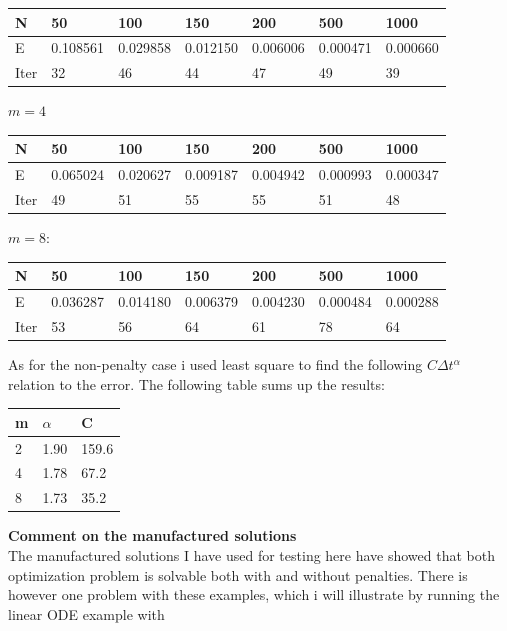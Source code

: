 \documentclass[11pt,a4paper]{report}
\begin{document}
\begin{center}
    \begin{tabular}{| l | l | l | l | l | l | l |}
    \hline
    N & 50 & 100  & 150 & 200 & 500 & 1000 \\ \hline
    E & 0.108561 & 0.029858 &0.012150 & 0.006006 & 0.000471 & 0.000660	\\ \hline
    Iter & 32 & 46  & 44 & 47 & 49 & 39 \\ \hline
    \end{tabular}
\end{center}
$m=4$
\begin{center}
    \begin{tabular}{| l | l | l | l | l | l | l |}
    \hline
    N & 50 & 100  & 150 & 200 & 500 & 1000 \\ \hline
    E & 0.065024 & 0.020627& 0.009187& 0.004942 & 0.000993 & 0.000347\\ \hline
    Iter & 49 & 51  & 55 & 55 & 51 & 48 \\ \hline
    \end{tabular}
\end{center}
$m=8$:
\begin{center}
    \begin{tabular}{| l | l | l | l | l | l | l |}
    \hline
    N & 50 & 100  & 150 & 200 & 500 & 1000 \\ \hline
    E & 0.036287 & 0.014180 &0.006379 & 0.004230 & 0.000484 & 0.000288	\\ \hline
    Iter & 53 & 56  & 64 & 61 & 78 & 64 \\ \hline
    \end{tabular}
\end{center}
As for the non-penalty case i used least square to find the following $C\Delta t^{\alpha}$ relation to the error. The following table sums up the results:
\begin{center}
    \begin{tabular}{| l | l | l |}
    \hline
    m & $\alpha$ & C \\ \hline
    2 & 1.90& 159.6\\ \hline
    4 & 1.78& 67.2\\ \hline
    8 & 1.73&35.2 \\ \hline
    \end{tabular}
\end{center}
\textbf{Comment on the manufactured solutions}
\\
The manufactured solutions I have used for testing here have showed that both optimization problem is solvable both with and without penalties. There is however one problem with these examples, which i will illustrate by running the linear ODE example with 
\end{document}
